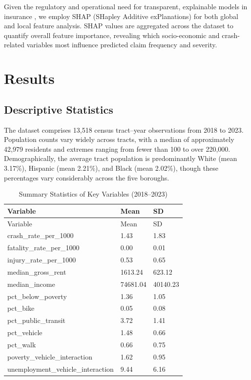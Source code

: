 \documentclass[
  number,
  review,
  3p]{elsarticle}
\begin{document}
Given the regulatory and operational need for transparent, explainable
models in insurance \citep{henckaerts, lundberg}, we employ SHAP
(SHapley Additive exPlanations) for both global and local feature
analysis. SHAP values are aggregated across the dataset to quantify
overall feature importance, revealing which socio-economic and
crash-related variables most influence predicted claim frequency and
severity.

\section{Results}\label{results}

\subsection{\texorpdfstring{\textbf{Descriptive
Statistics}}{Descriptive Statistics}}\label{descriptive-statistics}

The dataset comprises 13,518 census tract--year observations from 2018
to 2023. Population counts vary widely across tracts, with a median of
approximately 42,979 residents and extremes ranging from fewer than 100
to over 220,000. Demographically, the average tract population is
predominantly White (mean 3.17\%), Hispanic (mean 2.21\%), and Black
(mean 2.02\%), though these percentages vary considerably across the
five boroughs.

\begin{longtable}[]{@{}lll@{}}
\caption{Summary Statistics of Key Variables
(2018--2023)}\tabularnewline
\toprule\noalign{}
Variable & Mean & SD \\
\midrule\noalign{}
\endfirsthead
\toprule\noalign{}
Variable & Mean & SD \\
\midrule\noalign{}
\endhead
\bottomrule\noalign{}
\endlastfoot
crash\_rate\_per\_1000 & 1.43 & 1.83 \\
fatality\_rate\_per\_1000 & 0.00 & 0.01 \\
injury\_rate\_per\_1000 & 0.53 & 0.65 \\
median\_gross\_rent & 1613.24 & 623.12 \\
median\_income & 74681.04 & 40140.23 \\
pct\_below\_poverty & 1.36 & 1.05 \\
pct\_bike & 0.05 & 0.08 \\
pct\_public\_transit & 3.72 & 1.41 \\
pct\_vehicle & 1.48 & 0.66 \\
pct\_walk & 0.66 & 0.75 \\
poverty\_vehicle\_interaction & 1.62 & 0.95 \\
unemployment\_vehicle\_interaction & 9.44 & 6.16 \\
\end{longtable}
\end{document}
